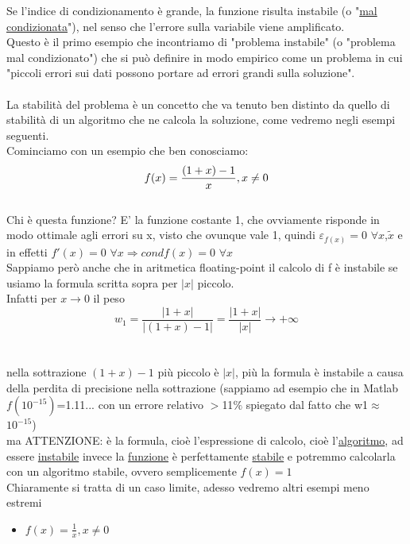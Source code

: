 \documentclass[12pt]{article}
\begin{document}
Se l'indice di condizionamento è grande, la funzione risulta instabile (o "\underline{mal condizionata}"), nel senso che l'errore sulla variabile viene amplificato.\\
Questo è il primo esempio che incontriamo di "problema instabile" (o "problema mal condizionato") che si può definire in modo empirico come un problema in cui "piccoli errori sui dati possono portare ad errori grandi sulla soluzione".\\\\
La stabilità del problema è un concetto che va tenuto ben distinto da quello di stabilità di un algoritmo che ne calcola la soluzione, come vedremo negli esempi seguenti.\\
Cominciamo con un esempio che ben conosciamo:\\
\begin{equation}\\
        f(x)=\frac{(1+x)-1}{x},x\neq0
\end{equation}\\
Chi è questa funzione? E' la funzione costante 1, che ovviamente risponde in modo ottimale agli errori su x, visto che ovunque vale 1, quindi $\varepsilon_{f(x)}=0$ $\forall x$,$\tilde{x}$ e in effetti $f'(x)=0 $ { } $\forall x \Rightarrow cond f(x)=0 $ { } $\forall x$\\
Sappiamo però anche che in aritmetica floating-point il calcolo di f è instabile se usiamo la formula scritta sopra per $\left|x\right|$ piccolo.\\
Infatti per $x\rightarrow 0$ il peso
\begin{equation}
    w_1=\frac{\left|1+x\right|}{\left|(1+x)-1\right|}=\frac{\left|1+x\right|}{\left|x\right|}\rightarrow +\infty
\end{equation}
\\\\nella sottrazione $(1+x)-1$ più piccolo è $\left|x\right|$, più la formula è instabile a causa della perdita di precisione nella sottrazione
(sappiamo ad esempio che in Matlab $f(10^{-15})$=1.11... con un errore relativo $>$11$\%$ spiegato dal fatto che w1$\approx$ $10^{-15}$)\\
ma ATTENZIONE: è la formula, cioè l'espressione di calcolo, cioè l'\underline{algoritmo}, ad essere \underline{instabile} invece la \underline{funzione} è perfettamente \underline{stabile} e potremmo calcolarla con un algoritmo stabile, ovvero semplicemente $f(x)=1$\\
Chiaramente si tratta di un caso limite, adesso vedremo altri esempi meno estremi
\begin{itemize}
    \item $f(x)=\frac{1}{x},x\neq 0$
\end{itemize}
\end{document}
